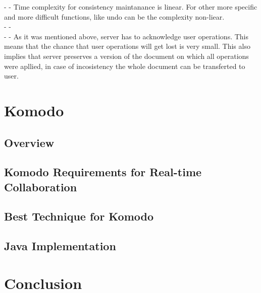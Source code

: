 \documentclass[12pt,oneside]{fithesis2}
\begin{document}
- \underline{} - Time complexity for consistency maintanance is linear. For other more specific and more difficult functions, like undo can be the complexity non-liear.\\
- \underline{} - \\
- \underline{} - As it was mentioned above, server has to acknowledge user operations. This means that the chance that user operations will get lost is very small. This also implies that server preserves a version of the document on which all operations were apllied, in case of incosistency the whole document can be transferted to user.\\
\chapter{Komodo}
\section{Overview}
\section{Komodo Requirements for Real-time Collaboration}
\section{Best Technique for Komodo}
\section{Java Implementation}
\chapter{Conclusion}
 
 
\end{document}
